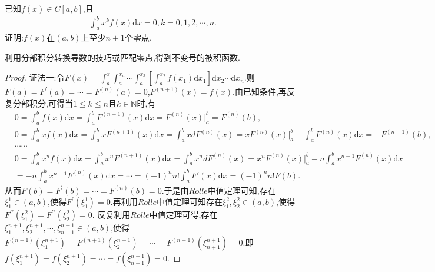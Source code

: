 \documentclass[../../main.tex]{subfiles}
\begin{document}
\begin{proposition}\label{proposition:x^kf积分为0则f至少有n+1个零点}
已知$f(x)\in C[a,b]$,且
\begin{align*}
\int_a^b{x^kf\left( x \right) \mathrm{d}x}=0, k=0,1,2,\cdots ,n .
\end{align*}
证明:$f(x)$在$(a,b)$上至少$n+1$个零点.
\end{proposition}
\begin{note}
利用分部积分转换导数的技巧或匹配零点,得到不变号的被积函数.
\end{note}
\begin{proof}
{\color{blue}证法一:}令\(F(x)=\int_a^x\int_a^{x_n}\cdots\int_a^{x_3}\left[\int_a^{x_2}f(x_1)\mathrm{d}x_1\right]\mathrm{d}x_2\cdots \mathrm{d}x_n\).则\(F(a)=F^\prime(a)=\cdots=F^{(n)}(a)=0\),\(F^{(n + 1)}(x)=f(x)\).由已知条件,再反复分部积分,可得当\(1\leqslant k\leqslant n\)且\(k\in\mathbb{N}\)时,有
\begin{align*}
&0=\int_a^b{f\left( x \right) \mathrm{d}x}=\int_a^b{F^{\left( n+1 \right)}\left( x \right) \mathrm{d}x}=F^{\left( n \right)}\left( x \right) \Big|_{a}^{b}=F^{\left( n \right)}\left( b \right) ,
\\
&0=\int_a^b{xf\left( x \right) \mathrm{d}x}=\int_a^b{xF^{\left( n+1 \right)}\left( x \right) \mathrm{d}x}=\int_a^b{xdF^{\left( n \right)}\left( x \right)}=xF^{\left( n \right)}\left( x \right) \Big| _{a}^{b}-\int_a^b{F^{\left( n \right)}\left( x \right) \mathrm{d}x}=-F^{\left( n-1 \right)}\left( b \right) ,
\\
&\cdots \cdots 
\\
&0=\int_a^b{x^nf\left( x \right) \mathrm{d}x}=\int_a^b{x^nF^{\left( n+1 \right)}\left( x \right) \mathrm{d}x}=\int_a^b{x^ndF^{\left( n \right)}\left( x \right)}=x^nF^{\left( n \right)}\left( x \right) \Big| _{a}^{b}-n\int_a^b{x^{n-1}F^{\left( n \right)}\left( x \right) \mathrm{d}x}
\\
&=-n\int_a^b{x^{n-1}F^{\left( n \right)}\left( x \right) \mathrm{d}x}=\cdots =\left( -1 \right) ^nn!\int_a^b{F'\left( x \right) \mathrm{d}x}=\left( -1 \right) ^nn!F\left( b \right) .
\end{align*}
从而\(F(b)=F^\prime(b)=\cdots=F^{(n)}(b)=0\).于是由\(Rolle\)中值定理可知,存在\(\xi_1^1\in(a,b)\),使得\(F^\prime(\xi_1^1)=0\).再利用\(Rolle\)中值定理可知存在\(\xi_1^2,\xi_2^2\in(a,b)\),使得\(F^{\prime\prime}(\xi_1^2)=F^{\prime\prime}(\xi_2^2)=0\).
反复利用\(Rolle\)中值定理可得,存在\(\xi_1^{n + 1},\xi_2^{n + 1},\cdots,\xi_{n + 1}^{n + 1}\in(a,b)\),使得\(F^{(n + 1)}(\xi_1^{n + 1})=F^{(n + 1)}(\xi_2^{n + 1})=\cdots=F^{(n + 1)}(\xi_{n + 1}^{n + 1})=0\).即\(f(\xi_1^{n + 1})=f(\xi_2^{n + 1})=\cdots=f(\xi_{n + 1}^{n + 1})=0\).


\end{proof}
\end{document}

